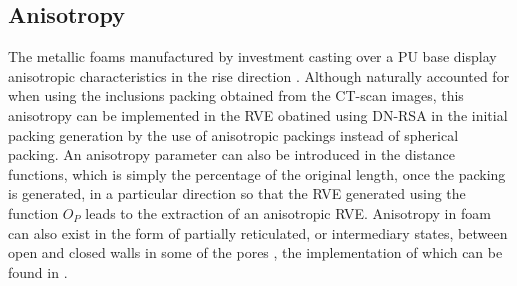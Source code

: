 \subsection{Anisotropy}\label{of-feature-anisotropy}
The metallic foams manufactured by investment casting over a PU base display anisotropic characteristics in the rise direction \cite{jangMicrostructureOpencellFoams2008}. Although naturally accounted for when using the inclusions packing obtained from the CT-scan images, {this anisotropy can be implemented in the RVE obatined using DN-RSA in the initial packing generation by the use of anisotropic packings instead of spherical packing. An anisotropy parameter can also be introduced in the distance functions, which is simply the percentage of the original length, once the packing is generated, in a particular direction so that the RVE generated using the function $ O_P $ leads to the extraction of an anisotropic RVE. Anisotropy in foam can also exist in the form of partially reticulated, or intermediary states, between open and closed walls in some of the pores \cite{jangCompressiveStrengthOpencell2010}, the implementation of which can be found in \cite{sononAdvancedApproachGeneration2015}}.

